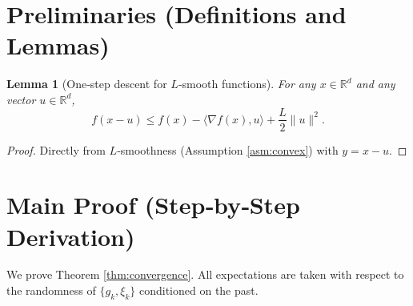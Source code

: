 \documentclass{article}
\newtheorem{lemma}{Lemma}
\newcommand{\R}{\mathbb{R}}
\newcommand{\ip}[2]{\langle #1,#2\rangle}
\begin{document}
\section*{Preliminaries (Definitions and Lemmas)}
\begin{lemma}[One‑step descent for $L$‑smooth functions]\label{lem:descent}
For any $x\in\R^{d}$ and any vector $u\in\R^{d}$,
\[
f(x-u)\le f(x)-\ip{\nabla f(x)}{u}+\frac{L}{2}\|u\|^{2}.
\]
\end{lemma}
\begin{proof}
Directly from $L$‑smoothness (Assumption \ref{asm:convex}) with $y=x-u$.
\end{proof}

\section*{Main Proof (Step‑by‑Step Derivation)}
We prove Theorem \ref{thm:convergence}.  
All expectations are taken with respect to the randomness of $\{g_{k},\xi_{k}\}$ conditioned on the past.
\end{document}
